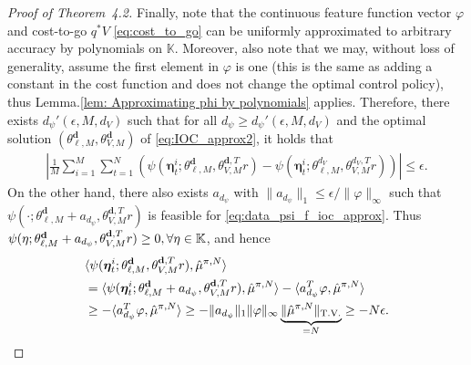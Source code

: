 \begin{proof}[Proof of Theorem~4.2]
Finally, note that the continuous feature function vector $\varphi$ and cost-to-go $q^*V$ \eqref{eq:cost_to_go} can be uniformly approximated to arbitrary accuracy by polynomials on $\mathbb{K}$. 
Moreover, also note that we may, without loss of generality, assume the first element in $\varphi$ is one (this is the same as adding a constant in the cost function and does not change the optimal control policy), thus Lemma.\ref{lem: Approximating phi by polynomials} applies. 
Therefore, there exists $d_\psi'(\epsilon,M,d_V)$ such that for all $d_\psi\ge d_\psi'(\epsilon,M,d_V)$ and the optimal solution $(\theta_{\ell, M}^{\mathbf{d}}, \theta_{V, M}^{\mathbf{d}})$ of \eqref{eq:IOC_approx2}, it holds that
\begin{align}
    \left| \frac{1}{M}\!\sum_{i=1}^M\!\sum_{t=1}^N\!\!\left(\!\psi(\bm\eta_t^i;\theta_{\ell,M}^{\mathbf{d}},\theta_{V,M}^{\mathbf{d},T}r)\!-\!\psi(\bm\eta_t^i;\theta_{\ell,M}^{d_V},\theta_{V,M}^{d_V,T}r)\!\right)\!\right| \leq \epsilon.\label{eq: dpsi approx}
\end{align}
On the other hand, there also exists $a_{d_\psi}$ with $ \|a_{d_\psi}\|_1\leq \epsilon/\|\varphi\|_\infty $ such that
$\psi(\cdot;\theta_{\ell,M}^{\mathbf{d}}+a_{d_\psi},\theta_{V,M}^{\mathbf{d},T}r)$
is feasible for \eqref{eq:data_psi_f_ioc_approx}.
Thus $\psi(\eta;\theta_{\ell,M}^{\mathbf{d}}+a_{d_\psi},\theta_{V,M}^{\mathbf{d},T}r) \geq 0,\forall \eta\in\mathbb{K}$, and hence
\begin{align*}
    &\langle \psi(\bm\eta_t^i;\theta_{\ell,M}^{\mathbf{d}},\theta_{V,M}^{\mathbf{d},T}r), \hat{\mu}^{\relax{\pi},N} \rangle \\
    &= \langle \psi(\bm\eta_t^i;\theta_{\ell,M}^{\mathbf{d}}+a_{d_\psi},\theta_{V,M}^{\mathbf{d},T}r), \hat{\mu}^{\relax{\pi},N} \rangle - \langle a_{d_\psi}^T\varphi, \hat{\mu}^{\relax{\pi},N} \rangle \\
    &\ge -\langle a_{d_\psi}^T\varphi, \hat{\mu}^{\relax{\pi},N} \rangle \ge -\|a_{d_\psi}\|_1\|\varphi\|_\infty\underbrace{\|\hat{\mu}^{\relax{\pi},N}\|_{\operatorname*{T.V.}}}_{=N} \geq -N\epsilon.
\end{align*}



\end{proof}
